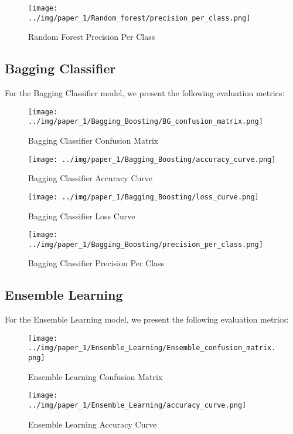 \begin{figure}[H]
	\centering
	\texttt{[image: ../img/paper\_1/Random\_forest/precision\_per\_class.png]}
	\caption{Random Forest Precision Per Class}
\end{figure}

\subsection{Bagging Classifier}

For the Bagging Classifier model, we present the following evaluation metrics:

\begin{figure}[H]
	\centering
	\texttt{[image: ../img/paper\_1/Bagging\_Boosting/BG\_confusion\_matrix.png]}
	\caption{Bagging Classifier Confusion Matrix}
\end{figure}

\begin{figure}[H]
	\centering
	\texttt{[image: ../img/paper\_1/Bagging\_Boosting/accuracy\_curve.png]}
	\caption{Bagging Classifier Accuracy Curve}
\end{figure}

\begin{figure}[H]
	\centering
	\texttt{[image: ../img/paper\_1/Bagging\_Boosting/loss\_curve.png]}
	\caption{Bagging Classifier Loss Curve}
\end{figure}

\begin{figure}[H]
	\centering
	\texttt{[image: ../img/paper\_1/Bagging\_Boosting/precision\_per\_class.png]}
	\caption{Bagging Classifier Precision Per Class}
\end{figure}

\subsection{Ensemble Learning}

For the Ensemble Learning model, we present the following evaluation metrics:

\begin{figure}[H]
	\centering
	\texttt{[image: ../img/paper\_1/Ensemble\_Learning/Ensemble\_confusion\_matrix.png]}
	\caption{Ensemble Learning Confusion Matrix}
\end{figure}

\begin{figure}[H]
	\centering
	\texttt{[image: ../img/paper\_1/Ensemble\_Learning/accuracy\_curve.png]}
	\caption{Ensemble Learning Accuracy Curve}
\end{figure}

